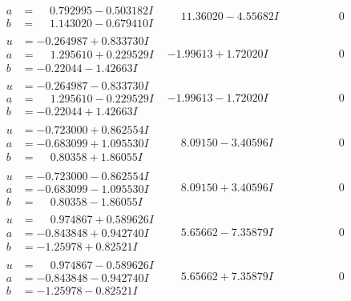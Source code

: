 \documentclass[1p]{elsarticle_modified}
\theoremstyle{definition}
\begin{document}
$$\begin{array}{c|c|c}
\begin{aligned}
a &= \phantom{-}0.792995 - 0.503182 I \\
b &= \phantom{-}1.143020 - 0.679410 I\end{aligned}
 & \phantom{-}11.36020 - 4.55682 I & \phantom{-0.000000 } 0 \\ \hline\begin{aligned}
u &= -0.264987 + 0.833730 I \\
a &= \phantom{-}1.295610 + 0.229529 I \\
b &= -0.22044 - 1.42663 I\end{aligned}
 & -1.99613 + 1.72020 I & \phantom{-0.000000 } 0 \\ \hline\begin{aligned}
u &= -0.264987 - 0.833730 I \\
a &= \phantom{-}1.295610 - 0.229529 I \\
b &= -0.22044 + 1.42663 I\end{aligned}
 & -1.99613 - 1.72020 I & \phantom{-0.000000 } 0 \\ \hline\begin{aligned}
u &= -0.723000 + 0.862554 I \\
a &= -0.683099 + 1.095530 I \\
b &= \phantom{-}0.80358 + 1.86055 I\end{aligned}
 & \phantom{-}8.09150 - 3.40596 I & \phantom{-0.000000 } 0 \\ \hline\begin{aligned}
u &= -0.723000 - 0.862554 I \\
a &= -0.683099 - 1.095530 I \\
b &= \phantom{-}0.80358 - 1.86055 I\end{aligned}
 & \phantom{-}8.09150 + 3.40596 I & \phantom{-0.000000 } 0 \\ \hline\begin{aligned}
u &= \phantom{-}0.974867 + 0.589626 I \\
a &= -0.843848 + 0.942740 I \\
b &= -1.25978 + 0.82521 I\end{aligned}
 & \phantom{-}5.65662 - 7.35879 I & \phantom{-0.000000 } 0 \\ \hline\begin{aligned}
u &= \phantom{-}0.974867 - 0.589626 I \\
a &= -0.843848 - 0.942740 I \\
b &= -1.25978 - 0.82521 I\end{aligned}
 & \phantom{-}5.65662 + 7.35879 I & \phantom{-0.000000 } 0 \\ \hline\begin{aligned}

\end{aligned}
\end{array}$$
\end{document}
